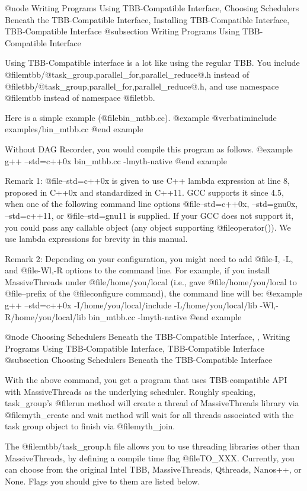 @node Writing Programs Using TBB-Compatible Interface, Choosing Schedulers Beneath the TBB-Compatible Interface, Installing TBB-Compatible Interface, TBB-Compatible Interface
@subsection Writing Programs Using TBB-Compatible Interface

Using TBB-Compatible interface is a lot like using the regular TBB.  You
include @file{mtbb/@{task_group,parallel_for,parallel_reduce@}.h}
instead of @file{tbb/@{task_group,parallel_for,parallel_reduce@}.h}, and
use namespace @file{mtbb} instead of namespace @file{tbb}.

Here is a simple example (@file{bin_mtbb.cc}).
@example
@verbatiminclude examples/bin_mtbb.cc
@end example

Without DAG Recorder, you would compile this program as follows.
@example
g++ --std=c++0x bin_mtbb.cc -lmyth-native
@end example

Remark 1: @file{--std=c++0x} is given to use C++ lambda expression at
line 8, proposed in C++0x and standardized in C++11.  GCC supports it
since 4.5, when one of the following command line options
@file{--std=c++0x, --std=gnu0x, --std=c++11}, or @file{--std=gnu11} is
supplied.  If your GCC does not support it, you could pass any callable
object (any object supporting @file{operator()}).  We use lambda
expressions for brevity in this manual.

Remark 2: Depending on your configuration, you might need to add
@file{-I, -L,} and @file{-Wl,-R} options to the command line.  For
example, if you install MassiveThreads under @file{/home/you/local} (i.e.,
gave @file{/home/you/local} to @file{--prefix} of the @file{configure}
command), the command line will be:
@example
g++ --std=c++0x -I/home/you/local/include -L/home/you/local/lib -Wl,-R/home/you/local/lib bin_mtbb.cc -lmyth-native
@end example

@node Choosing Schedulers Beneath the TBB-Compatible Interface,  , Writing Programs Using TBB-Compatible Interface, TBB-Compatible Interface
@subsection Choosing Schedulers Beneath the TBB-Compatible Interface

With the above command, you get a program that uses TBB-compatible API
with MassiveThreads as the underlying scheduler.  Roughly speaking,
task_group's @file{run} method will create a thread of MassiveThreads
library via @file{myth_create} and wait method will wait for all threads
associated with the task group object to finish via @file{myth_join}.

The @file{mtbb/task_group.h} file allows you to use threading libraries other than MassiveThreads, by defining a compile time flag @file{TO_XXX}.  Currently, you can choose from the original Intel TBB, MassiveThreads, Qthreads, Nanos++, or None.  Flags you should give to them are listed below.

